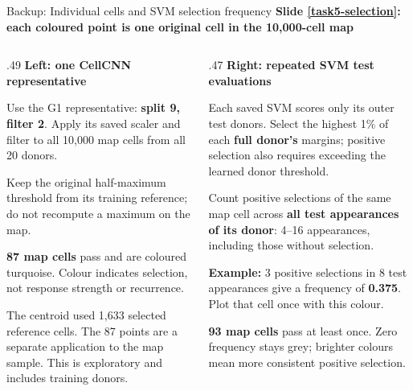\documentclass[aspectratio=169,10pt]{beamer}
\newcommand{\eyebrow}[1]{{\color{Teal}\bfseries #1}\par\smallskip}
\begin{document}
\begin{frame}{Backup: Individual cells and SVM selection frequency}
  \small
  \eyebrow{Slide \ref{task5-selection}: each coloured point is one original cell in the 10,000-cell map}
  \begin{columns}[T,onlytextwidth]
    \begin{column}{.49\textwidth}
      \textbf{Left: one CellCNN representative}\par\smallskip
      Use the G1 representative: \textbf{split 9, filter 2}. Apply its saved scaler and filter to all 10,000 map cells from all 20 donors.\par\medskip
      Keep the original half-maximum threshold from its training reference; do not recompute a maximum on the map.\par\medskip
      \textbf{87 map cells} pass and are coloured turquoise. Colour indicates selection, not response strength or recurrence.\par\medskip
      The centroid used 1,633 selected reference cells. The 87 points are a separate application to the map sample. This is exploratory and includes training donors.
    \end{column}
    \begin{column}{.47\textwidth}
      \textbf{Right: repeated SVM test evaluations}\par\smallskip
      Each saved SVM scores only its outer test donors. Select the highest 1\% of each \textbf{full donor's} margins; positive selection also requires exceeding the learned donor threshold.\par\medskip
      Count positive selections of the same map cell across \textbf{all test appearances of its donor}: 4--16 appearances, including those without selection.\par\medskip
      \textbf{Example:} 3 positive selections in 8 test appearances give a frequency of \textbf{0.375}. Plot that cell once with this colour.\par\medskip
      \textbf{93 map cells} pass at least once. Zero frequency stays grey; brighter colours mean more consistent positive selection.
    \end{column}
  \end{columns}
\end{frame}
\end{document}

